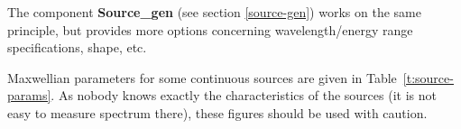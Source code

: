 The component {\bf Source\_gen} (see section \ref{source-gen})
works on the same principle, but provides more options concerning
wavelength/energy range specifications, shape, etc.

Maxwellian parameters for some continuous sources
are given in Table~\ref{t:source-params}. As nobody knows exactly the characteristics of the sources (it is not easy to measure spectrum there), these figures should be used with caution.

